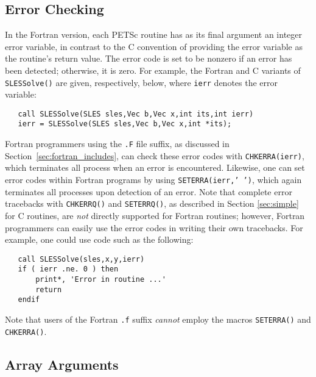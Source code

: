 \subsection{Error Checking}
\label{sec:fortran_errors}

In the Fortran version, each PETSc routine has as its final argument
an integer error variable, in contrast to the C convention of
providing the error variable as the routine's return value.  The error
code is set to be nonzero if an error has been detected; otherwise, it
is zero.  For example, the Fortran and C variants of {\tt SLESSolve()} are
given, respectively, below, where {\tt ierr} denotes the error variable:
\begin{verbatim}
   call SLESSolve(SLES sles,Vec b,Vec x,int its,int ierr)
   ierr = SLESSolve(SLES sles,Vec b,Vec x,int *its);
\end{verbatim}

Fortran programmers using the {\tt .F} file suffix, as discussed in
Section~\ref{sec:fortran_includes}, can check these error codes with
{\tt CHKERRA(ierr)}, which terminates all process when an error is
encountered.  Likewise, one can set error codes within Fortran programs by
using {\tt SETERRA(ierr,' ')}, which again terminates all processes
upon detection of an error.  
Note that complete error tracebacks with
{\tt CHKERRQ()} and {\tt SETERRQ()}, as described in Section
\ref{sec:simple} for C routines, are {\em not} directly supported for
Fortran routines; however, Fortran programmers can easily use the
error codes in writing their own tracebacks.  For example, one could
use code such as the following:
\begin{verbatim}
   call SLESSolve(sles,x,y,ierr)
   if ( ierr .ne. 0 ) then
       print*, 'Error in routine ...'
       return
   endif
\end{verbatim}
Note that users of the Fortran {\tt .f} suffix {\em cannot} employ the
macros {\tt SETERRA()} and {\tt CHKERRA()}.

\subsection{Array Arguments}
\label{sec:fortran_arrays}

